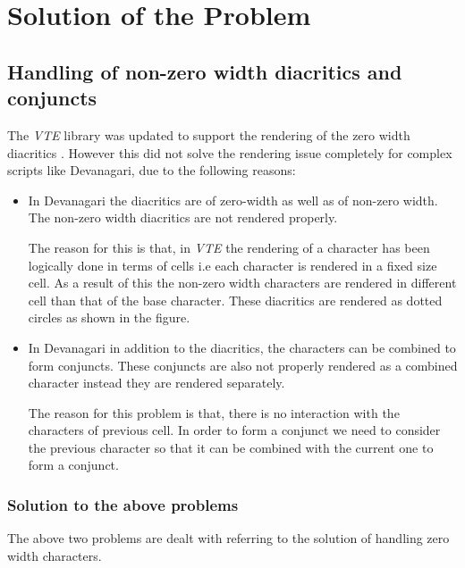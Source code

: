 %

\chapter{Solution of the Problem}
\section{Handling of non-zero width diacritics and conjuncts}
The \textit{VTE} library was updated to support the rendering of the zero width diacritics . However this did not solve the rendering issue completely for complex scripts like Devanagari, due to the following reasons:

\begin{itemize}
\item In Devanagari the diacritics are of zero-width as well as of non-zero width. The non-zero width diacritics are not rendered properly.

The reason for this is that, in \textit{VTE} the rendering of a character has been logically done in terms of cells i.e each character is rendered in a fixed size cell. As a result of this the non-zero width characters are rendered in different cell than that of the base character. These diacritics are rendered as dotted circles as shown in the figure.
\item In Devanagari in addition to the diacritics, the characters can be combined to form conjuncts. These conjuncts are also not properly rendered as a combined character instead they are rendered separately.

The reason for this problem is that, there is no interaction with the characters of previous cell. In order to form a conjunct we need to consider the previous character so that it can be combined with the current one to form a conjunct.
\end{itemize}

\subsection{Solution to the above problems}
The above two problems are dealt with referring to the solution of handling zero width characters.

